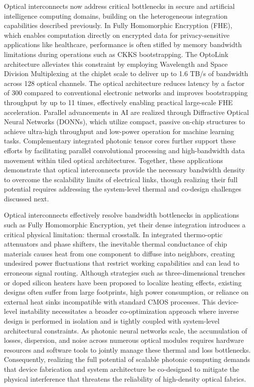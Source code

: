 \documentclass[11pt]{article}
\begin{document}
Optical interconnects now address critical bottlenecks in secure and artificial intelligence computing domains, building on the heterogeneous integration capabilities described previously. In Fully Homomorphic Encryption (FHE), which enables computation directly on encrypted data for privacy-sensitive applications like healthcare, performance is often stifled by memory bandwidth limitations during operations such as CKKS bootstrapping. The OptoLink architecture alleviates this constraint by employing Wavelength and Space Division Multiplexing at the chiplet scale to deliver up to 1.6 TB/s of bandwidth across 128 optical channels. The optical architecture reduces latency by a factor of 300 compared to conventional electronic networks and improves bootstrapping throughput by up to 11 times, effectively enabling practical large-scale FHE acceleration. Parallel advancements in AI are realized through Diffractive Optical Neural Networks (DONNs), which utilize compact, passive on-chip structures to achieve ultra-high throughput and low-power operation for machine learning tasks. Complementary integrated photonic tensor cores further support these efforts by facilitating parallel convolutional processing and high-bandwidth data movement within tiled optical architectures. Together, these applications demonstrate that optical interconnects provide the necessary bandwidth density to overcome the scalability limits of electrical links, though realizing their full potential requires addressing the system-level thermal and co-design challenges discussed next. \citep{doi_10_1145_3806395_315ab915} \citep{doi_10_1002_nap2_70098_8d5f2f8a} \citep{doi_10_1515_nanoph_2022_0423_38a2c3ec}

Optical interconnects effectively resolve bandwidth bottlenecks in applications such as Fully Homomorphic Encryption, yet their dense integration introduces a critical physical limitation: thermal crosstalk. In integrated thermo-optic attenuators and phase shifters, the inevitable thermal conductance of chip materials causes heat from one component to diffuse into neighbors, creating undesired power fluctuations that restrict working capabilities and can lead to erroneous signal routing. Although strategies such as three-dimensional trenches or doped silicon heaters have been proposed to localize heating effects, existing designs often suffer from large footprints, high power consumption, or reliance on external heat sinks incompatible with standard CMOS processes. This device-level instability necessitates a broader co-optimization approach where inverse design is performed in isolation and is tightly coupled with system-level architectural constraints. As photonic neural networks scale, the accumulation of losses, dispersion, and noise across numerous optical modules requires hardware resources and software tools to jointly manage these thermal and loss bottlenecks. Consequently, realizing the full potential of scalable photonic computing demands that device fabrication and system architecture be co-designed to mitigate the physical interference that threatens the reliability of high-density optical fabrics. \citep{doi_10_1109_access_2020_3013116_8fec1fb2} \citep{doi_10_1145_3806395_315ab915} \citep{doi_10_3390_nano14080697_c372a140}
\end{document}

